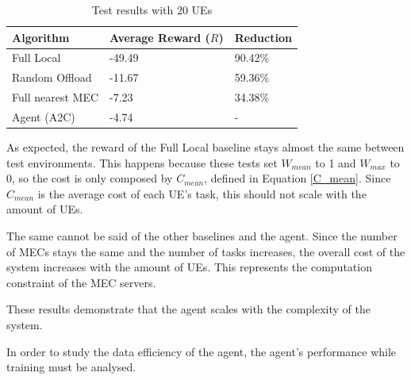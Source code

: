 \documentclass[conference]{IEEEtran}
\begin{document}
\begin{table}[H]
\centering
\begin{tabular}{|l|l|l|}
\hline
Algorithm        & Average Reward ($R$) & Reduction\\ \hline
Full Local       & -49.49 & 90.42\%\\
Random Offload   & -11.67 & 59.36\%\\
Full nearest MEC & -7.23 & 34.38\%\\ 
Agent (A2C) & -4.74 & -\\ \hline
\end{tabular}
\caption{Test results with 20 \acrshort{UE}s} \label{results_5_20}
\end{table}

As expected, the reward of the Full Local baseline stays almost the same between test environments. This happens because these tests set $W_{mean}$ to 1 and $W_{max}$ to 0, so the cost is only composed by $C_{mean}$, defined in Equation \ref{C_mean}. Since $C_{mean}$ is the average cost of each \acrshort{UE}'s task, this should not scale with the amount of \acrshort{UE}s.

The same cannot be said of the other baselines and the agent. Since the number of \acrshort{MEC}s stays the same and the number of tasks increases, the overall cost of the system increases with the amount of \acrshort{UE}s. This represents the computation constraint of the \acrshort{MEC} servers. 

These results demonstrate that the agent scales with the complexity of the system.

In order to study the data efficiency of the agent, the agent's performance while training must be analysed.
\end{document}
